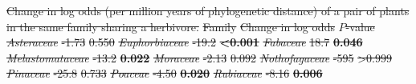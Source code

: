 \documentclass[12pt]{article}
\providecommand{\DIFdel}[1]{{\protect\color{red}\sout{#1}}}                      %
\providecommand{\DIFdelFL}[1]{\DIFdel{#1}} %
\providecommand{\DIFdelbeginFL}{} %
\newcommand{\DIFscaledelfig}{0.5}
\newlength{\DIFdelgraphicswidth} %
\newlength{\DIFdelgraphicsheight} %
\newcommand{\DIFdelincludegraphics}[2][]{%
\sbox{\DIFdelgraphicsbox}{\DIFOincludegraphics[#1]{#2}}%
\settoboxwidth{\DIFdelgraphicswidth}{\DIFdelgraphicsbox} %
\settoboxtotalheight{\DIFdelgraphicsheight}{\DIFdelgraphicsbox} %
\scalebox{\DIFscaledelfig}{%
\parbox[b]{\DIFdelgraphicswidth}{\usebox{\DIFdelgraphicsbox}\\[-\baselineskip] \rule{\DIFdelgraphicswidth}{0em}}\llap{\resizebox{\DIFdelgraphicswidth}{\DIFdelgraphicsheight}{%
\setlength{\unitlength}{\DIFdelgraphicswidth}%
\begin{picture}(1,1)%
\thicklines\linethickness{2pt} %
{\color[rgb]{1,0,0}\put(0,0){\framebox(1,1){}}}%
{\color[rgb]{1,0,0}\put(0,0){\line( 1,1){1}}}%
{\color[rgb]{1,0,0}\put(0,1){\line(1,-1){1}}}%
\end{picture}%
}\hspace*{3pt}}} %
} %
\DeclareRobustCommand{\DIFdelbeginFL}{\DIFOdelbeginFL \let\includegraphics\DIFdelincludegraphics} %
\begin{document}
  \begin{table}[!h]
  \DIFdelbeginFL %
{%
\DIFdelFL{Change in log odds (per million years of phylogenetic distance) of a pair of plants in the same family sharing a herbivore.}}
\DIFdelFL{Family }%
\DIFdelFL{Change in log odds }%
\DIFdelFL{$P$-value }%
\emph{\DIFdelFL{Asteraceae}} %
\DIFdelFL{-1.73 }%
\DIFdelFL{0.550 }%
\emph{\DIFdelFL{Euphorbiaceae}} %
\DIFdelFL{-19.2 }%
\textbf{\DIFdelFL{\textless0.001}} %
\emph{\DIFdelFL{Fabaceae}} %
\DIFdelFL{18.7 }%
\textbf{\DIFdelFL{0.046}} %
\emph{\DIFdelFL{Melastomataceae}} %
\DIFdelFL{-13.2 }%
\textbf{\DIFdelFL{0.022}} %
\emph{\DIFdelFL{Moraceae}} %
\DIFdelFL{-2.13 }%
\DIFdelFL{0.092 }%
\emph{\DIFdelFL{Nothofagaceae}} %
\DIFdelFL{-595 }%
\DIFdelFL{\textgreater{0.999} }%
\emph{\DIFdelFL{Pinaceae}} %
\DIFdelFL{-25.8 }%
\DIFdelFL{0.733 }%
\emph{\DIFdelFL{Poaceae}} %
\DIFdelFL{-4.50 }%
\textbf{\DIFdelFL{0.020}} %
\emph{\DIFdelFL{Rubiaceae}} %
\DIFdelFL{-8.16 }%
\textbf{\DIFdelFL{0.006}} %


\end{table}
\end{document}
